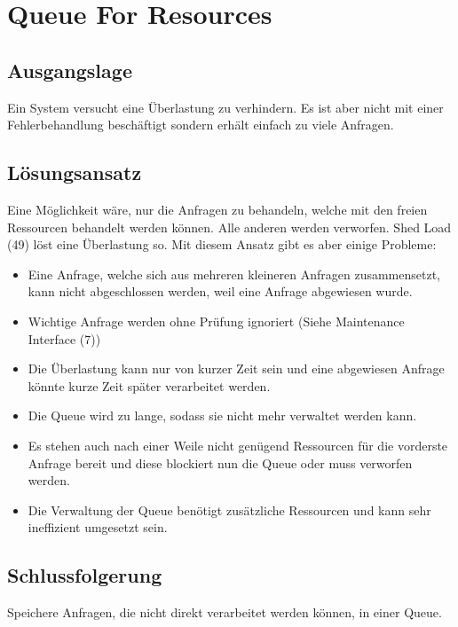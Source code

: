 \section{Queue For Resources}

\subsection{Ausgangslage}

Ein System versucht eine Überlastung zu verhindern. Es ist aber nicht mit einer Fehlerbehandlung beschäftigt sondern erhält einfach zu viele Anfragen.

\subsection{Lösungsansatz}

Eine Möglichkeit wäre, nur die Anfragen zu behandeln, welche mit den freien Ressourcen behandelt werden können. Alle anderen werden verworfen. Shed Load (49) löst eine Überlastung so. Mit diesem Ansatz gibt es aber einige Probleme:
\begin{itemize}
	\item Eine Anfrage, welche sich aus mehreren kleineren Anfragen zusammensetzt, kann nicht abgeschlossen werden, weil eine Anfrage abgewiesen wurde.
	\item Wichtige Anfrage werden ohne Prüfung ignoriert (Siehe Maintenance Interface (7))
	\item Die Überlastung kann nur von kurzer Zeit sein und eine abgewiesen Anfrage könnte kurze Zeit später verarbeitet werden.
\end{itemize}

\begin{itemize}
	\item Die Queue wird zu lange, sodass sie nicht mehr verwaltet werden kann.
	\item Es stehen auch nach einer Weile nicht genügend Ressourcen für die vorderste Anfrage bereit und diese blockiert nun die Queue oder muss verworfen werden.
	\item Die Verwaltung der Queue benötigt zusätzliche Ressourcen und kann sehr ineffizient umgesetzt sein.
\end{itemize}

\subsection{Schlussfolgerung}

Speichere Anfragen, die nicht direkt verarbeitet werden können, in einer Queue.


